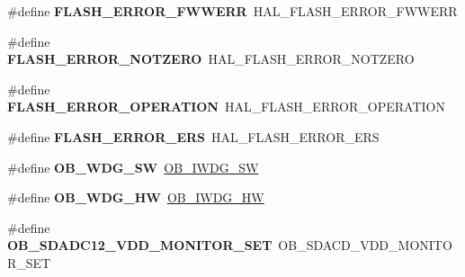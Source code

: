 \begin{DoxyCompactItemize}
\mbox{\label{group___h_a_l___f_l_a_s_h___aliased___defines_ga9386eae0fe9e5b47720ad2378d27e743}} 
\#define {\bfseries F\+L\+A\+S\+H\+\_\+\+E\+R\+R\+O\+R\+\_\+\+F\+W\+W\+E\+RR}~H\+A\+L\+\_\+\+F\+L\+A\+S\+H\+\_\+\+E\+R\+R\+O\+R\+\_\+\+F\+W\+W\+E\+RR
\item 
\mbox{\label{group___h_a_l___f_l_a_s_h___aliased___defines_ga987edd2bf3a39310a655473718d9b495}} 
\#define {\bfseries F\+L\+A\+S\+H\+\_\+\+E\+R\+R\+O\+R\+\_\+\+N\+O\+T\+Z\+E\+RO}~H\+A\+L\+\_\+\+F\+L\+A\+S\+H\+\_\+\+E\+R\+R\+O\+R\+\_\+\+N\+O\+T\+Z\+E\+RO
\item 
\mbox{\label{group___h_a_l___f_l_a_s_h___aliased___defines_gaae29e90680573edfa4e11e07b2557f16}} 
\#define {\bfseries F\+L\+A\+S\+H\+\_\+\+E\+R\+R\+O\+R\+\_\+\+O\+P\+E\+R\+A\+T\+I\+ON}~H\+A\+L\+\_\+\+F\+L\+A\+S\+H\+\_\+\+E\+R\+R\+O\+R\+\_\+\+O\+P\+E\+R\+A\+T\+I\+ON
\item 
\mbox{\label{group___h_a_l___f_l_a_s_h___aliased___defines_gaf908de74b3e013ed30976d9e645354e2}} 
\#define {\bfseries F\+L\+A\+S\+H\+\_\+\+E\+R\+R\+O\+R\+\_\+\+E\+RS}~H\+A\+L\+\_\+\+F\+L\+A\+S\+H\+\_\+\+E\+R\+R\+O\+R\+\_\+\+E\+RS
\item 
\mbox{\label{group___h_a_l___f_l_a_s_h___aliased___defines_gac332a5aa5da146e19f3c39067220f0f8}} 
\#define {\bfseries O\+B\+\_\+\+W\+D\+G\+\_\+\+SW}~\hyperlink{group___f_l_a_s_h_ex___o_b___i_watchdog_ga5a357e232c955444c3f2ccb9a937ffce}{O\+B\+\_\+\+I\+W\+D\+G\+\_\+\+SW}
\item 
\mbox{\label{group___h_a_l___f_l_a_s_h___aliased___defines_gae9a94b5f21aaa5dd5558095fa684b5a3}} 
\#define {\bfseries O\+B\+\_\+\+W\+D\+G\+\_\+\+HW}~\hyperlink{group___f_l_a_s_h_ex___o_b___i_watchdog_gadfcbfa963d79c339ec8e2d5a7734e47a}{O\+B\+\_\+\+I\+W\+D\+G\+\_\+\+HW}
\item 
\mbox{\label{group___h_a_l___f_l_a_s_h___aliased___defines_ga28d03f0c0e87570a3bc2faa4e720b8e3}} 
\#define {\bfseries O\+B\+\_\+\+S\+D\+A\+D\+C12\+\_\+\+V\+D\+D\+\_\+\+M\+O\+N\+I\+T\+O\+R\+\_\+\+S\+ET}~O\+B\+\_\+\+S\+D\+A\+C\+D\+\_\+\+V\+D\+D\+\_\+\+M\+O\+N\+I\+T\+O\+R\+\_\+\+S\+ET

\end{DoxyCompactItemize}
